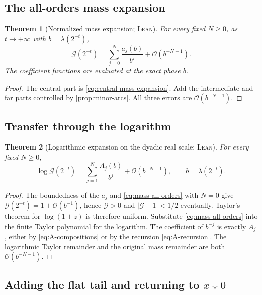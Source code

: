 \documentclass[11pt,oneside]{article}
\newtheorem{theorem}{Theorem}[section]
\theoremstyle{definition}
\theoremstyle{remark}
\newcommand{\bigO}{\mathcal O}
\newcommand{\Formalized}{\textsc{Lean}}
\begin{document}
\subsection{The all-orders mass expansion}

\begin{theorem}[Normalized mass expansion; \Formalized]
\label{thm:mass-all-orders}
For every fixed $N\geq0$, as $t\to+\infty$ with
$b=\lambda(2^{-t})$,
\begin{equation}
 \mathcal G(2^{-t})
 =\sum_{j=0}^{N}\frac{a_j(b)}{b^j}
  +\bigO(b^{-N-1}). \label{eq:mass-all-orders}
\end{equation}
The coefficient functions are evaluated at the exact phase $b$.
\end{theorem}

\begin{proof}
The central part is \eqref{eq:central-mass-expansion}.  Add the
intermediate and far parts controlled by \cref{prop:minor-arcs}.  All
three errors are $\bigO(b^{-N-1})$.
\end{proof}

\subsection{Transfer through the logarithm}

\begin{theorem}[Logarithmic expansion on the dyadic real scale;
\Formalized]
\label{thm:log-dyadic-all-orders}
For every fixed $N\geq0$,
\begin{equation}
 \log\mathcal G(2^{-t})
 =\sum_{j=1}^{N}\frac{A_j(b)}{b^j}
  +\bigO(b^{-N-1}),
 \qquad b=\lambda(2^{-t}). \label{eq:log-mass-all-orders}
\end{equation}
\end{theorem}

\begin{proof}
The boundedness of the $a_j$ and \eqref{eq:mass-all-orders} with $N=0$
give $\mathcal G(2^{-t})=1+\bigO(b^{-1})$, hence
$\mathcal G>0$ and $|\mathcal G-1|<1/2$ eventually.  Taylor's theorem for
$\log(1+z)$ is therefore uniform.  Substitute
\eqref{eq:mass-all-orders} into the finite Taylor polynomial for the
logarithm.  The coefficient of $b^{-j}$ is exactly $A_j$, either by
\eqref{eq:A-compositions} or by the recursion
\eqref{eq:A-recursion}.  The logarithmic Taylor remainder and the
original mass remainder are both $\bigO(b^{-N-1})$.
\end{proof}

\subsection{Adding the flat tail and returning to \texorpdfstring{\(x\downarrow0\)}{x to 0}}
\end{document}
